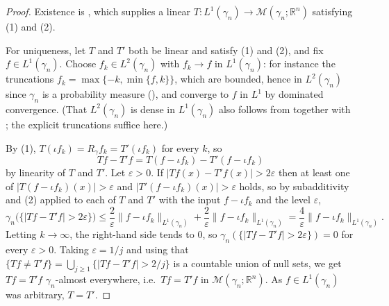 \begin{proof}
Existence is , which supplies a linear
$T : L^1(\gamma_n) \to \mathcal{M}(\gamma_n;\mathbb{R}^n)$ satisfying (1) and (2).

For uniqueness, let $T$ and $T'$ both be linear and satisfy (1) and (2), and fix
$f \in L^1(\gamma_n)$.  Choose $f_k \in L^2(\gamma_n)$ with $f_k \to f$ in
$L^1(\gamma_n)$: for instance the truncations
$f_k = \max\{-k,\min\{f,k\}\}$, which are bounded, hence in $L^2(\gamma_n)$ since
$\gamma_n$ is a probability measure (), and converge to $f$
in $L^1$ by dominated convergence.  (That $L^2(\gamma_n)$ is dense in
$L^1(\gamma_n)$ also follows from  together with
; the explicit truncations suffice here.)

By (1), $T(\iota f_k) = R_\gamma f_k = T'(\iota f_k)$ for every $k$, so
\[
  T f - T' f = T(f - \iota f_k) - T'(f - \iota f_k)
\]
by linearity of $T$ and $T'$.  Let $\varepsilon > 0$.  If
$|Tf(x) - T'f(x)| > 2\varepsilon$ then at least one of
$|T(f-\iota f_k)(x)| > \varepsilon$ and $|T'(f-\iota f_k)(x)| > \varepsilon$ holds,
so by subadditivity and (2) applied to each of $T$ and $T'$ with the input
$f - \iota f_k$ and the level $\varepsilon$,
\[
  \gamma_n\bigl(\{|Tf - T'f| > 2\varepsilon\}\bigr)
    \leq \frac{2}{\varepsilon}\|f - \iota f_k\|_{L^1(\gamma_n)}
       + \frac{2}{\varepsilon}\|f - \iota f_k\|_{L^1(\gamma_n)}
    = \frac{4}{\varepsilon}\|f - \iota f_k\|_{L^1(\gamma_n)} .
\]
Letting $k \to \infty$, the right-hand side tends to $0$, so
$\gamma_n(\{|Tf-T'f| > 2\varepsilon\}) = 0$ for every $\varepsilon > 0$.  Taking
$\varepsilon = 1/j$ and using that
$\{Tf \neq T'f\} = \bigcup_{j\geq1}\{|Tf-T'f| > 2/j\}$ is a countable union of
null sets, we get $Tf = T'f$ $\gamma_n$-almost everywhere, i.e.\ $Tf = T'f$ in
$\mathcal{M}(\gamma_n;\mathbb{R}^n)$.  As $f \in L^1(\gamma_n)$ was arbitrary,
$T = T'$.
\end{proof}
